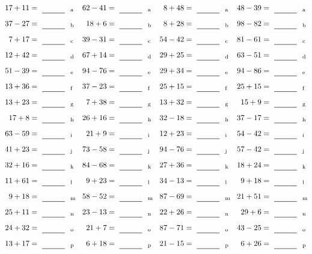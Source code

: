 \documentclass
[
  draft    = true,
  fontsize = 11pt,
  parskip  = half-
]
{scrartcl}
\begin{document}
\clearpage
\begin{align*}
    \pline{17+11}&=\rline{a}
  & \pline{62-41}&=\rline{a}
  & \pline{8+48}&=\rline{a}
  & \pline{48-39}&=\rline{a} \\[1ex]
    \pline{37-27}&=\rline{b}
  & \pline{18+6}&=\rline{b}
  & \pline{8+28}&=\rline{b}
  & \pline{98-82}&=\rline{b} \\[1ex]
    \pline{7+17}&=\rline{c}
  & \pline{39-31}&=\rline{c}
  & \pline{54-42}&=\rline{c}
  & \pline{81-61}&=\rline{c} \\[1ex]
    \pline{12+42}&=\rline{d}
  & \pline{67+14}&=\rline{d}
  & \pline{29+25}&=\rline{d}
  & \pline{63-51}&=\rline{d} \\[1ex]
    \pline{51-39}&=\rline{e}
  & \pline{94-76}&=\rline{e}
  & \pline{29+34}&=\rline{e}
  & \pline{94-86}&=\rline{e} \\[1ex]
    \pline{13+36}&=\rline{f}
  & \pline{37-23}&=\rline{f}
  & \pline{25+15}&=\rline{f}
  & \pline{25+15}&=\rline{f} \\[1ex]
    \pline{13+23}&=\rline{g}
  & \pline{7+38}&=\rline{g}
  & \pline{13+32}&=\rline{g}
  & \pline{15+9}&=\rline{g} \\[1ex]
    \pline{17+8}&=\rline{h}
  & \pline{26+16}&=\rline{h}
  & \pline{32-18}&=\rline{h}
  & \pline{37-17}&=\rline{h} \\[1ex]
    \pline{63-59}&=\rline{i}
  & \pline{21+9}&=\rline{i}
  & \pline{12+23}&=\rline{i}
  & \pline{54-42}&=\rline{i} \\[1ex]
    \pline{41+23}&=\rline{j}
  & \pline{73-58}&=\rline{j}
  & \pline{94-76}&=\rline{j}
  & \pline{57-42}&=\rline{j} \\[1ex]
    \pline{32+16}&=\rline{k}
  & \pline{84-68}&=\rline{k}
  & \pline{27+36}&=\rline{k}
  & \pline{18+24}&=\rline{k} \\[1ex]
    \pline{11+61}&=\rline{l}
  & \pline{9+23}&=\rline{l}
  & \pline{34-13}&=\rline{l}
  & \pline{9+18}&=\rline{l} \\[1ex]
    \pline{9+18}&=\rline{m}
  & \pline{58-52}&=\rline{m}
  & \pline{87-69}&=\rline{m}
  & \pline{21+51}&=\rline{m} \\[1ex]
    \pline{25+11}&=\rline{n}
  & \pline{23-13}&=\rline{n}
  & \pline{22+26}&=\rline{n}
  & \pline{29+6}&=\rline{n} \\[1ex]
    \pline{24+32}&=\rline{o}
  & \pline{21+7}&=\rline{o}
  & \pline{87-71}&=\rline{o}
  & \pline{43-25}&=\rline{o} \\[1ex]
    \pline{13+17}&=\rline{p}
  & \pline{6+18}&=\rline{p}
  & \pline{21-15}&=\rline{p}
  & \pline{6+26}&=\rline{p}
\end{align*}
\end{document}
